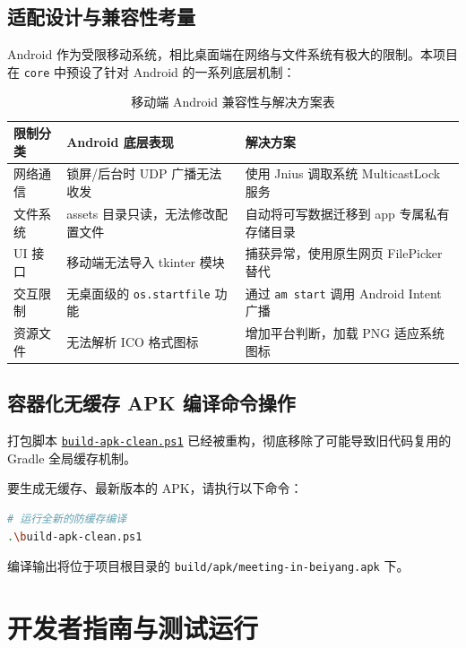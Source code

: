 \documentclass[UTF8]{ctexart}
\begin{document}
\subsection{适配设计与兼容性考量}
Android 作为受限移动系统，相比桌面端在网络与文件系统有极大的限制。本项目在 \texttt{core} 中预设了针对 Android 的一系列底层机制：
\begin{table}[htbp]
  \centering
  \caption{移动端 Android 兼容性与解决方案表}
  \begin{tabular}{lll}
    \toprule
    限制分类 & Android 底层表现 & 解决方案 \\
    \midrule
    网络通信 & 锁屏/后台时 UDP 广播无法收发 & 使用 Jnius 调取系统 MulticastLock 服务 \\
    文件系统 & assets 目录只读，无法修改配置文件 & 自动将可写数据迁移到 app 专属私有存储目录 \\
    UI 接口 & 移动端无法导入 tkinter 模块 & 捕获异常，使用原生网页 FilePicker 替代 \\
    交互限制 & 无桌面级的 \texttt{os.startfile} 功能 & 通过 \texttt{am start} 调用 Android Intent 广播 \\
    资源文件 & 无法解析 ICO 格式图标 & 增加平台判断，加载 PNG 适应系统图标 \\
    \bottomrule
  \end{tabular}
\end{table}

\subsection{容器化无缓存 APK 编译命令操作}
打包脚本 \href{file:///E:/Alotofink/Python/Challenge/challenge3/build-apk-clean.ps1}{\texttt{build-apk-clean.ps1}} 已经被重构，彻底移除了可能导致旧代码复用的 Gradle 全局缓存机制。

要生成无缓存、最新版本的 APK，请执行以下命令：
\begin{lstlisting}[language=bash]
# 运行全新的防缓存编译
.\build-apk-clean.ps1
\end{lstlisting}
编译输出将位于项目根目录的 \texttt{build/apk/meeting-in-beiyang.apk} 下。

\section{开发者指南与测试运行}
\end{document}
